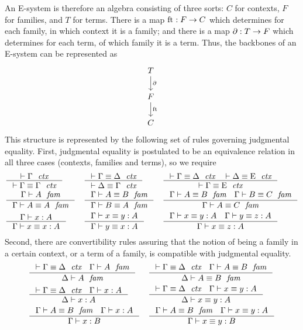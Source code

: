 An E-system is therefore an algebra consisting of three sorts: $C$ for contexts,
$F$ for families, and $T$ for terms. There is a map 
$\mathrm{ft}_{}:F\to C$ which determines for each family, in which context it is a
family; and there is a map $\partial_{}:T\to F$ which determines for each term, of
which family it is a term. Thus, the backbones of an E-system can be represented
as
\begin{equation*}
\begin{tikzcd}
T \arrow[d,"\ebd"] \\ F \arrow[d,"\eft"] \\ C
\end{tikzcd}
\end{equation*}
This structure is represented by the following set of rules governing judgmental
equality. First, judgmental equality is postulated to be an equivalence relation
in all three cases (contexts, families and terms), so we require
\begin{align*}
& \inference
  { \jctx{\Gamma}
    }
  { \jctxeq{\Gamma}{\Gamma}
    } 
& & \inference
    { \jctxeq{\Gamma}{\Delta}
      }
    { \jctxeq{\Delta}{\Gamma}
      } 
& & \inference
    { \jctxeq{\Gamma}{\Delta}
      \jctxeq{\Delta}{\greek{E}}
      }
    { \jctxeq{\Gamma}{\greek{E}}
      }
    \\
& \inference
  { \jfam{\Gamma}{A}
    }
  { \jfameq{\Gamma}{A}{A}
    } 
& & \inference
    { \jfameq{\Gamma}{A}{B}
      }
    { \jfameq{\Gamma}{B}{A}
      }
& & \inference
    { \jfameq{\Gamma}{A}{B}
      \jfameq{\Gamma}{B}{C}
      }
    { \jfameq{\Gamma}{A}{C}
      }
    \\
& \inference
  { \jterm{\Gamma}{A}{x}
    }
  { \jtermeq{\Gamma}{A}{x}{x}
    }
& & \inference
    { \jtermeq{\Gamma}{A}{x}{y}
      }
    { \jtermeq{\Gamma}{A}{y}{x}
      }
& & \inference
    { \jtermeq{\Gamma}{A}{x}{y}
      \jtermeq{\Gamma}{A}{y}{z}
      }
    { \jtermeq{\Gamma}{A}{x}{z}
      }
\end{align*}
Second, there are convertibility rules assuring that the notion of being a
family in a certain context, or a term of a family, is compatible with judgmental
equality.
\begin{align*}
& \inference
  { \jctxeq{\Gamma}{\Delta}
    \jfam{\Gamma}{A}
    }
  { \jfam{\Delta}{A}
    }
& & \inference
    { \jctxeq{\Gamma}{\Delta}
      \jfameq{\Gamma}{A}{B}
      }
    { \jfameq{\Delta}{A}{B}
      }
    \\
& \inference
  { \jctxeq{\Gamma}{\Delta}
    \jterm{\Gamma}{A}{x}
    }
  { \jterm{\Delta}{A}{x}
    }
& & \inference
    { \jctxeq{\Gamma}{\Delta}
      \jtermeq{\Gamma}{A}{x}{y}
      }
    { \jtermeq{\Delta}{A}{x}{y}
      }
    \\
& \inference
  { \jfameq{\Gamma}{A}{B}
    \jterm{\Gamma}{A}{x}
    }
  { \jterm{\Gamma}{B}{x}
    }
& & \inference
    { \jfameq{\Gamma}{A}{B}
      \jtermeq{\Gamma}{A}{x}{y}
      }
    { \jtermeq{\Gamma}{B}{x}{y}
      }
\end{align*}
